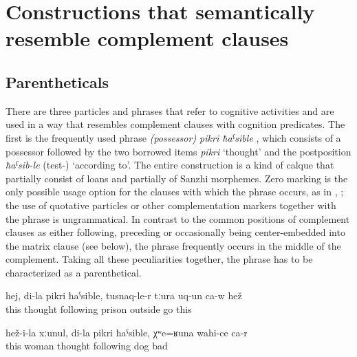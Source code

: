 \section{Constructions that semantically resemble complement clauses}
\label{Constructions that semantically resemble complement clauses}


\subsection{Parentheticals}
\label{ssec:Parentheticals}

There are three particles and phrases that refer to cognitive activities and are used in a way that resembles complement clauses with cognition predicates. The first is the frequently used phrase \textit{(possessor) pikri ħaˁsible} , which consists of a possessor followed by the two borrowed items \textit{pikri} `thought' and the postposition \textit{ħaˁsib-le} (test-) `according to'. The entire construction is a kind of calque that partially consist of loans and partially of Sanzhi morphemes. Zero marking is the only possible usage option for the clauses with which the phrase occurs, as in , ; the use of quotative particles or other complementation markers together with the phrase is ungrammatical. In contrast to the common positions of complement clauses as either following, preceding or occasionally being center-embedded into the matrix clause (see  below), the phrase frequently occurs in the middle of the complement. Taking all these peculiarities together, the phrase has to be characterized as a parenthetical. 
%
\begin{exe}
	\ex	\label{ex:‎In my mind, he left prison}
	\gll	hej,	di-la	pikri	ħaˁsible,	tusnaq-le-r	tːura	uq-un	ca-w	hež\\
		this		thought following	prison	outside	go		this\\
	\glt	{}

	\ex	\label{ex:His wife is, in my mind bad like a dog@15}
	\gll	hež-i-la	xːunul,	di-la	pikri	ħaˁsible,	χʷe=ʁuna	wahi-ce	ca-r \\
		this	woman		thought	following	dog	bad	\\
	\glt	{}
\end{exe}

